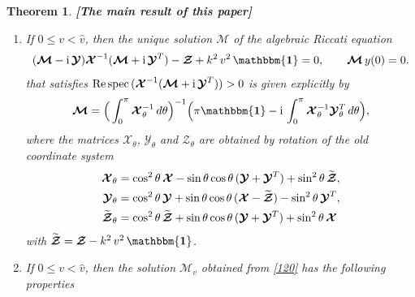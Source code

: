 \documentclass[10pt]{article}
\newcommand{\id}{{\mathbf{\mathbbm{1}}}}
\newtheorem{theorem}{Theorem}[section]
\begin{document}
\begin{theorem}{\rm {\bf [The main result of this paper]}}
\begin{enumerate}
 		\item 
 		If $0\leq v<\widehat{v}$, then the unique solution $\mathcal{M}$ of the \textit{algebraic Riccati equation} 
 		\begin{align}\label{120}
 			(  \boldsymbol{\mathcal{M}}- {\rm i}\,  \boldsymbol{\mathcal{Y}})  \boldsymbol{\mathcal{X}}^{-1}(  \boldsymbol{\mathcal{M}}+ {\rm i}\, \boldsymbol{\mathcal{Y}}^T)- \boldsymbol {\mathcal{Z}}+k^2\, v^2\,{\id}=0, \qquad  {  \boldsymbol{\mathcal{M}}}\, y(0)=0.
 		\end{align}
 		that satisfies  $\text{\rm Re\,spec}\,(   \boldsymbol{\mathcal{X}}^{-1}( \boldsymbol {\mathcal{M}}+{\rm i}\,  \boldsymbol{\mathcal{Y}}^T))>0$ is given explicitly by
 		\begin{align}\label{fmv}
 			\boldsymbol{\mathcal{M}}=\Big(\int_{0}^{\pi}	  \boldsymbol {\mathcal{X}}_  { \theta} ^{-1}\, d\theta\Big)^{-1}\Big(\pi\id-  {\rm i}\, \int_{0}^{\pi}   \boldsymbol{\mathcal{X}}_  { \theta} ^{-1}   {   \boldsymbol{\mathcal{Y}}}_\theta  ^T\, d\theta\Big),
 		\end{align}
 			where the  matrices $ \boldsymbol {\mathcal{X}}_  { \theta}$, $  \boldsymbol{\mathcal{Y}}_  { \theta}$ and $  \boldsymbol{\mathcal{Z}}_  { \theta}$ are  obtained by rotation of the old coordinate system
 		\begin{align}\label{21}
 			\boldsymbol{\mathcal{X}}_  { \theta} & = \cos^2\theta\,  \boldsymbol{\mathcal{X}}-\sin\theta\cos\theta\,(  \boldsymbol{\mathcal{Y}}+  \boldsymbol{\mathcal{Y}}^T)+\sin^2\theta\,\widetilde{  \boldsymbol{\mathcal{Z}}},\notag\vspace{2mm}\\
 			\boldsymbol{\mathcal{Y}}_\theta  & = \cos^2\theta\,  \boldsymbol{\mathcal{Y}}+\sin\theta\cos\theta
 			\,(  \boldsymbol{\mathcal{X}}-\widetilde{  \boldsymbol{\mathcal{Z}}})-\sin^2\theta\,  \boldsymbol{\mathcal{Y}}^T,\vspace{2mm}\\
 			\widetilde{  \boldsymbol{\mathcal{Z}}}_\theta & = \cos^2\theta\,\widetilde{  \boldsymbol{\mathcal{Z}}}+\sin\theta\cos\theta\,(  \boldsymbol{\mathcal{Y}}+  \boldsymbol{\mathcal{Y}}^T)+\sin^2\theta\,  \boldsymbol{\mathcal{X}}\notag
 		\end{align}
 			with   $\widetilde{  \boldsymbol{\mathcal{Z}}}=  \boldsymbol{\mathcal{Z}}-k^2\,v^2\,{\id}$.
 		\item 	If $0\leq v<\widehat{v}$, then  the solution  $  {\mathcal{M}}_v$ obtained from \eqref{120} has the following properties
 		\begin{enumerate}

\end{enumerate}
\end{enumerate}
\end{theorem}
\end{document}
